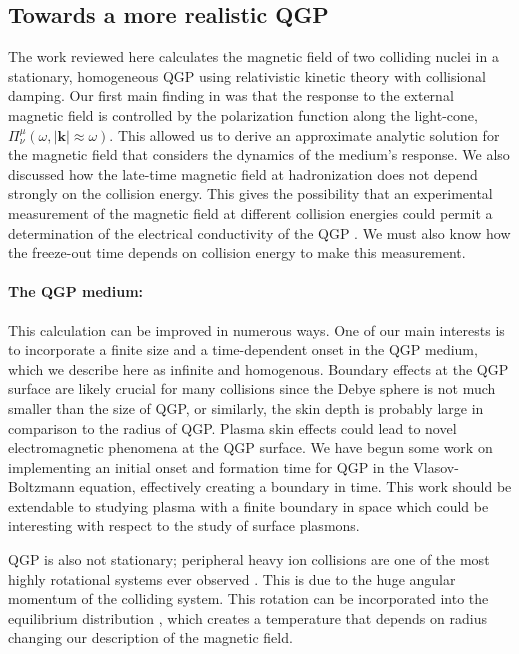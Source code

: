 
\subsection{Towards a more realistic QGP }\label{sec:ConclusionsQGP}
The work reviewed here calculates the magnetic field of two colliding nuclei in a stationary, homogeneous QGP using relativistic kinetic theory with collisional damping. Our first main finding in \cite{Grayson:2022asf} was that the response to the external magnetic field is controlled by the polarization function along the light-cone, $\Pi^\mu_\nu(\omega ,|\boldsymbol{k}|\approx\omega)$. This allowed us to derive an approximate analytic solution for the magnetic field that considers the dynamics of the medium's response. We also discussed how the late-time magnetic field at hadronization does not depend strongly on the collision energy. This gives the possibility that an experimental measurement of the magnetic field at different collision energies could permit a determination of the electrical conductivity of the QGP \cite{STAR:2023jdd}. We must also know how the freeze-out time depends on collision energy to make this measurement.

\paragraph{The QGP medium:}
This calculation can be improved in numerous ways. One of our main interests is to incorporate a finite size and a time-dependent onset in the QGP medium, which we describe here as infinite and homogenous. Boundary effects at the QGP surface are likely crucial for many collisions since the Debye sphere is not much smaller than the size of QGP, or similarly, the skin depth is probably large in comparison to the radius of QGP. Plasma skin effects could lead to novel electromagnetic phenomena at the QGP surface. We have begun some work on implementing an initial onset and formation time for QGP in the Vlasov-Boltzmann equation, effectively creating a boundary in time. This work should be extendable to studying plasma with a finite boundary in space which could be interesting with respect to the study of surface plasmons.

QGP is also not stationary; peripheral heavy ion collisions are one of the most highly rotational systems ever observed \cite{Csernai:2013bq,Deng:2016vhi,Jiang:2016woz,Becattini:2020pvq}. This is due to the huge angular momentum of the colliding system. This rotation can be incorporated into the equilibrium distribution \cite{Hakim:2011bk}, which creates a temperature that depends on radius \cite{Chernikov:1964edr} changing our description of the magnetic field.

